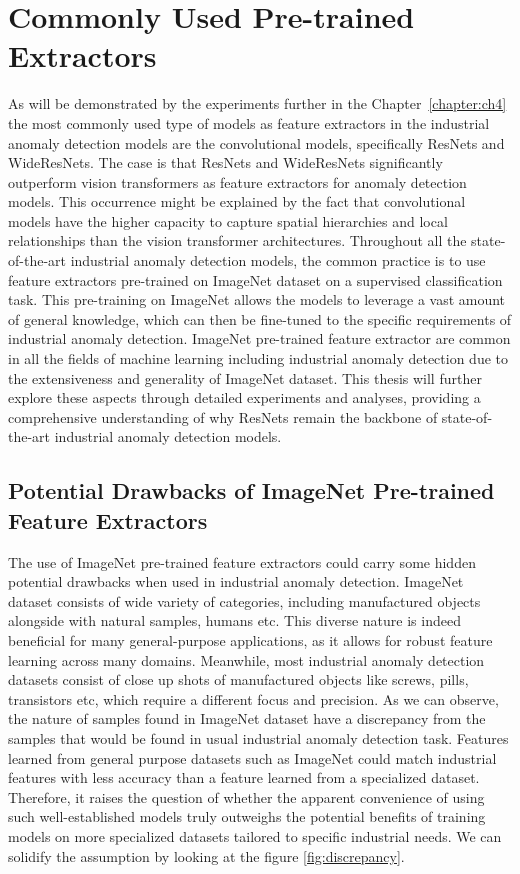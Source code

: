 \section{Commonly Used Pre-trained Extractors}
As will be demonstrated by the experiments further in the Chapter~\ref{chapter:ch4} the most commonly used type of models as feature extractors in the industrial anomaly detection models are the convolutional models\cite{pre_trained_iad}, specifically ResNets and WideResNets. The case is that ResNets and WideResNets significantly outperform vision transformers as feature extractors for anomaly detection models\cite{pre_trained_iad}. This occurrence might be explained by the fact that convolutional models have the higher capacity to capture spatial hierarchies and local relationships than the vision transformer architectures. Throughout all the state-of-the-art industrial anomaly detection models, the common practice is to use feature extractors pre-trained on ImageNet dataset on a supervised classification task\cite{pre_trained_iad}. This pre-training on ImageNet allows the models to leverage a vast amount of general knowledge, which can then be fine-tuned to the specific requirements of industrial anomaly detection\cite{patchcore}\cite{realnet}\cite{pre_trained_iad}\cite{iad_survey}\cite{uiad_survey}. ImageNet pre-trained feature extractor are common in all the fields of machine learning including industrial anomaly detection due to the extensiveness and generality of ImageNet dataset\cite{imagenet}. This thesis will further explore these aspects through detailed experiments and analyses, providing a comprehensive understanding of why ResNets remain the backbone of state-of-the-art industrial anomaly detection models.

\subsection{Potential Drawbacks of ImageNet Pre-trained Feature Extractors}
The use of ImageNet pre-trained feature extractors could carry some hidden potential drawbacks when used in industrial anomaly detection. ImageNet dataset consists of wide variety of categories, including manufactured objects alongside with natural samples, humans etc\cite{imagenet}. This diverse nature is indeed beneficial for many general-purpose applications, as it allows for robust feature learning across many domains. Meanwhile, most industrial anomaly detection datasets consist of close up shots of manufactured objects like screws, pills, transistors etc, which require a different focus and precision\cite{mvtecad}\cite{realnet}. As we can observe, the nature of samples found in ImageNet dataset have a discrepancy from the samples that would be found in usual industrial anomaly detection task. Features learned from general purpose datasets such as ImageNet could match industrial features with less accuracy than a feature learned from a specialized dataset. Therefore, it raises the question of whether the apparent convenience of using such well-established models truly outweighs the potential benefits of training models on more specialized datasets tailored to specific industrial needs. We can solidify the assumption by looking at the figure \ref{fig:discrepancy}.

